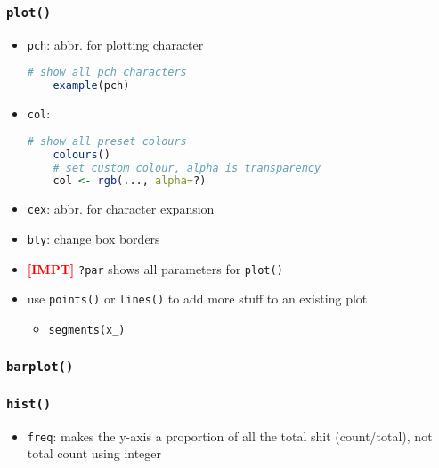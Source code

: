 \documentclass{article}
\newcommand{\impt}[0]{\textcolor{red}{\textbf{[IMPT] }}}
\begin{document}
\begin{multicols}{2}
\subsubsection*{\texttt{plot()}}
\begin{itemize}
	\item \texttt{pch}: abbr. for plotting character
	\begin{lstlisting}[language=R]
	# show all pch characters
	example(pch)\end{lstlisting}
	\item \texttt{col}:
	\begin{lstlisting}[language=R]
	# show all preset colours
	colours()
	# set custom colour, alpha is transparency
	col <- rgb(..., alpha=?)\end{lstlisting}
	\item \texttt{cex}: abbr. for character expansion
	\item \texttt{bty}: change box borders
	\item \impt \texttt{?par} shows all parameters for \texttt{plot()}
	\item use \texttt{points()} or \texttt{lines()} to add more stuff to an existing plot
	\begin{itemize}
		\item \texttt{segments(x\_)}
	\end{itemize}

\end{itemize}
\subsubsection*{\texttt{barplot()}}
\subsubsection*{\texttt{hist()}}
\begin{itemize}
	\item \texttt{freq}: makes the y-axis a proportion of all the total shit (count/total), not total count using integer
\end{itemize}


\end{multicols}
\end{document}
